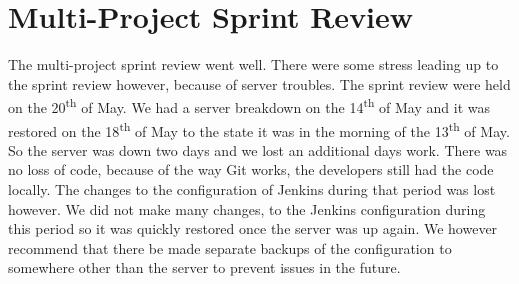 \section{Multi-Project Sprint Review}\label{sec:s4_multiprj_review}
The multi-project sprint review went well. There were some stress leading up to the sprint review however, because of server troubles. The sprint review were held on the 20\textsuperscript{th} of May. We had a server breakdown on the 14\textsuperscript{th} of May and it was restored on the 18\textsuperscript{th} of May to the state it was in the morning of the 13\textsuperscript{th} of May. So the server was down two days and we lost an additional days work. There was no loss of code, because of the way Git works, the developers still had the code locally. The changes to the configuration of Jenkins during that period was lost however. We did not make many changes, to the Jenkins configuration during this period so it was quickly restored once the server was up again. We however recommend that there be made separate backups of the configuration to somewhere other than the server to prevent issues in the future.